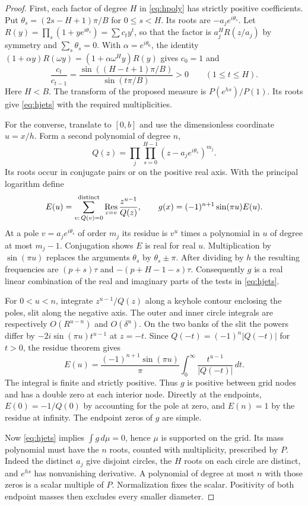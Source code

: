\documentclass[11pt,letterpaper]{article}
\theoremstyle{remark}\newtheorem{remark}[theorem]{Remark}
\begin{document}
\begin{proof}
First, each factor of degree $H$ in \eqref{eq:hpoly} has strictly positive coefficients. Put $\theta_s=(2s-H+1)\pi/B$ for $0\le s<H$. Its roots are $-a_je^{i\theta_s}$. Let $R(y)=\prod_s(1+ye^{i\theta_s})=\sum c_ty^t$, so that the factor is $a_j^H R(z/a_j)$ by symmetry and $\sum_s\theta_s=0$. With $\alpha=e^{i\theta_0}$, the identity $(1+\alpha y)R(\omega y)=(1+\alpha\omega^H y)R(y)$ gives $c_0=1$ and
\[
 \frac{c_t}{c_{t-1}}=\frac{\sin((H-t+1)\pi/B)}{\sin(t\pi/B)}>0 \qquad (1\le t\le H).
\]
Here $H<B$. The transform of the proposed measure is $P(e^{hs})/P(1)$. Its roots give \eqref{eq:hjets} with the required multiplicities.

For the converse, translate to $[0,b]$ and use the dimensionless coordinate $u=x/h$. Form a second polynomial of degree $n$,
\[
 Q(z)=\prod_j\prod_{s=0}^{H-1}(z-a_je^{i\theta_s})^{m_j}.
\]
Its roots occur in conjugate pairs or on the positive real axis. With the principal logarithm define
\[
 E(u)=\sum_{v:\,Q(v)=0}^{\rm distinct}\operatorname*{Res}_{z=v}\frac{z^{u-1}}{Q(z)},
 \qquad g(x)=(-1)^{n+1}\sin(\pi u)E(u).
\]
At a pole $v=a_je^{i\theta_s}$ of order $m_j$ its residue is $v^u$ times a polynomial in $u$ of degree at most $m_j-1$. Conjugation shows $E$ is real for real $u$. Multiplication by $\sin(\pi u)$ replaces the arguments $\theta_s$ by $\theta_s\pm\pi$. After dividing by $h$ the resulting frequencies are $(p+s)\tau$ and $-(p+H-1-s)\tau$. Consequently $g$ is a real linear combination of the real and imaginary parts of the tests in \eqref{eq:hjets}.

For $0<u<n$, integrate $z^{u-1}/Q(z)$ along a keyhole contour enclosing the poles, slit along the negative axis. The outer and inner circle integrals are respectively $O(R^{u-n})$ and $O(\delta^u)$. On the two banks of the slit the powers differ by $-2i\sin(\pi u)t^{u-1}$ at $z=-t$. Since $Q(-t)=(-1)^n|Q(-t)|$ for $t>0$, the residue theorem gives
\begin{equation}\label{eq:hcert}
 E(u)=\frac{(-1)^{n+1}\sin(\pi u)}{\pi}
 \int_0^\infty\frac{t^{u-1}}{|Q(-t)|}\,dt .
\end{equation}
The integral is finite and strictly positive. Thus $g$ is positive between grid nodes and has a double zero at each interior node. Directly at the endpoints, $E(0)=-1/Q(0)$ by accounting for the pole at zero, and $E(n)=1$ by the residue at infinity. The endpoint zeros of $g$ are simple.

Now \eqref{eq:hjets} implies $\int g\,d\mu=0$, hence $\mu$ is supported on the grid. Its mass polynomial must have the $n$ roots, counted with multiplicity, prescribed by $P$. Indeed the distinct $a_j$ give disjoint circles, the $H$ roots on each circle are distinct, and $e^{hs}$ has nonvanishing derivative. A polynomial of degree at most $n$ with those zeros is a scalar multiple of $P$. Normalization fixes the scalar. Positivity of both endpoint masses then excludes every smaller diameter.
\end{proof}
\end{document}
